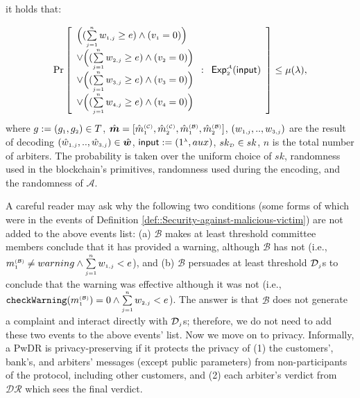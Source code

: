 \begin{definition}
it holds that:

$$ \Pr\left[
  \begin{array}{l}
  
 
\Big( (\sum\limits_{\st j=1}^{\st n}w_{\st 1,j}\geq e) \wedge ( v_{\st 1}=0)\Big) \\
 
 \vee \Big(( \sum\limits_{\st j=1}^{\st n}w_{\st 2,j}\geq e) \wedge ( v_{\st 2}=0)\Big) \\
 \vee  \Big(( \sum\limits_{\st j=1}^{\st n}w_{\st 3,j}\geq e) \wedge ( v_{\st 3}=0)\Big) \\
  \vee  \Big(( \sum\limits_{\st j=1}^{\st n}w_{\st 4,j}\geq e) \wedge ( v_{\st 4}=0)\Big) \\
\end{array} :
    \begin{array}{l}
    \mathsf{Exp}_{\st 2}^{\st\mathcal{A}}(\mathsf{input})\\
\end{array}    \right]\leq \mu(\lambda),$$
where $g:=(g_{\st 1}, g_{\st 2})\in T$, $\hat {\bm m}=[\hat {m}^{\st (\mathcal{C})}_{\st 1}, \hat {m}^{\st (\mathcal{C})}_{\st 2}, \hat {m}^{\st (\mathcal{B})}_{\st 1}, \hat {m}^{\st (\mathcal{B})}_{\st 2}]$, $(w_{\st 1,j},..,w_{\st 3,j})$ are the result of decoding   $(\hat w_{\st 1,j},..,\hat w_{\st 3,j})\in \hat {\bm w}$, $\mathsf{input}:=(1^{\st\lambda},  {aux})$, $ sk_{\st \mathcal{D}}\in sk$, $n$ is the total number of arbiters. The probability is taken over the uniform choice of $sk$, randomness used in the blockchain's primitives, randomness used during the encoding, and  the randomness of $\mathcal{A}$. 
\end{definition}


A careful reader may ask why the following two conditions (some forms of which were in the events of Definition \ref{def::Security-against-malicious-victim}) are not added to the above events list: (a) $\mathcal{B}$ makes at least threshold committee members conclude that it  has provided a warning, although $\mathcal{B}$ has not (i.e., $ m^{\scriptscriptstyle\mathcal{(B)}}_{\scriptscriptstyle1}\neq warning \wedge \sum\limits_{\scriptscriptstyle j=1}^{\scriptscriptstyle n}w_{\scriptscriptstyle 1,j}<  e$), and (b) $\mathcal{B}$ persuades at least threshold $\mathcal{D}_{\scriptscriptstyle j}$s  to conclude that the warning was effective although it was not (i.e., $\mathtt{checkWarning}(m^{\scriptscriptstyle\mathcal{(B)}}_{\scriptscriptstyle1})= 0 \wedge \sum\limits_{\scriptscriptstyle j=1}^{\scriptscriptstyle n}w_{\scriptscriptstyle 2,j}< e$). The answer is that  $\mathcal{B}$ does not generate a complaint  and interact directly with $\mathcal{D}_{\scriptscriptstyle j}$s; therefore, we do not need to add these two events to the above events' list. Now we move on to privacy. Informally, a PwDR is privacy-preserving if it protects the privacy of (1) the customers', bank's, and arbiters' messages (except public parameters) from  non-participants of the protocol, including other customers, and (2) each   arbiter's verdict from $\mathcal{DR}$  which sees the final verdict. 




